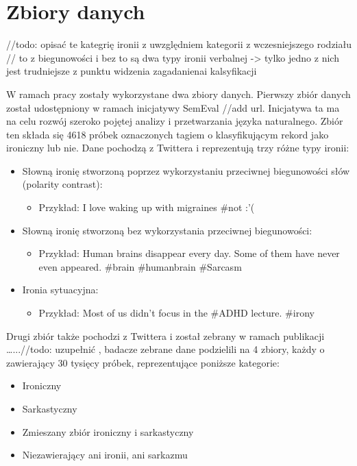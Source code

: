 \newpage %
\section{Zbiory danych}

//todo: opisać te kategrię ironii z uwzględniem kategorii z wczesniejszego rodziału
// to z biegunowości i bez to są dwa typy ironii verbalnej -> tylko jedno z nich jest trudniejsze z punktu widzenia zagadanienai kalsyfikacji

W ramach pracy zostały wykorzystane dwa zbiory danych. Pierwszy zbiór danych został udostępniony w ramach inicjatywy SemEval //add url. Inicjatywa ta ma na celu rozwój szeroko pojętej analizy i przetwarzania języka naturalnego. Zbiór ten składa się 4618 próbek oznaczonych tagiem o klasyfikującym rekord jako ironiczny lub nie. Dane pochodzą z Twittera i reprezentują trzy różne typy ironii:
\begin{itemize}
    \item Słowną ironię stworzoną poprzez wykorzystaniu przeciwnej biegunowości słów (polarity contrast):
          \begin{itemize}
              \item Przykład: I love waking up with migraines \#not :'(
          \end{itemize}

    \item Słowną ironię stworzoną bez wykorzystania przeciwnej biegunowości:
          \begin{itemize}
              \item Przykład: Human brains disappear every day. Some of them have never even appeared. \#brain \#humanbrain \#Sarcasm
          \end{itemize}

    \item Ironia sytuacyjna:
          \begin{itemize}
              \item Przykład: Most of us didn't focus in the \#ADHD lecture. \#irony
          \end{itemize}
\end{itemize}



Drugi zbiór także pochodzi z Twittera i został zebrany w ramach publikacji …...//todo: uzupełnić  , badacze zebrane dane podzielili na 4 zbiory, każdy o zawierający 30 tysięcy próbek,  reprezentujące poniższe kategorie:
\begin{itemize}
    \item Ironiczny
    \item Sarkastyczny
    \item Zmieszany zbiór ironiczny i sarkastyczny
    \item Niezawierający ani ironii, ani sarkazmu

\end{itemize}

